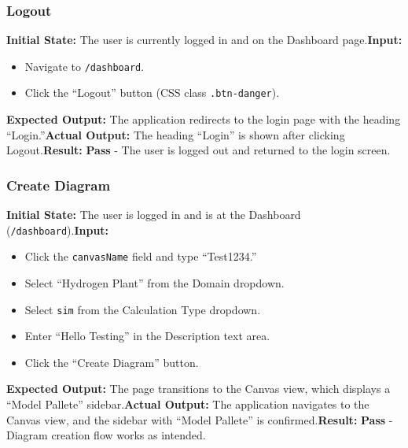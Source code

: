 \documentclass[12pt, titlepage]{article}
\begin{document}
\subsubsection{Logout} \textbf{Initial State:} The user is currently logged in and on the Dashboard page.\newline \textbf{Input:} \begin{itemize} \item Navigate to \texttt{/dashboard}.
\item Click the “Logout” button (CSS class \texttt{.btn-danger}).
\end{itemize} \textbf{Expected Output:} The application redirects to the login page with the heading “Login.”\newline \textbf{Actual Output:} The heading “Login” is shown after clicking Logout.\newline \textbf{Result:} \textbf{Pass} - The user is logged out and returned to the login screen.

\subsubsection{Create Diagram} \textbf{Initial State:} The user is logged in and is at the Dashboard (\texttt{/dashboard}).\newline \textbf{Input:} \begin{itemize} \item Click the \texttt{canvasName} field and type “Test1234.”
\item Select “Hydrogen Plant” from the Domain dropdown.
\item Select \texttt{sim} from the Calculation Type dropdown.
\item Enter “Hello Testing” in the Description text area.
\item Click the “Create Diagram” button.
\end{itemize} \textbf{Expected Output:} The page transitions to the Canvas view, which displays a “Model Pallete” sidebar.\newline \textbf{Actual Output:} The application navigates to the Canvas view, and the sidebar with “Model Pallete” is confirmed.\newline \textbf{Result:} \textbf{Pass} - Diagram creation flow works as intended.
\end{document}
